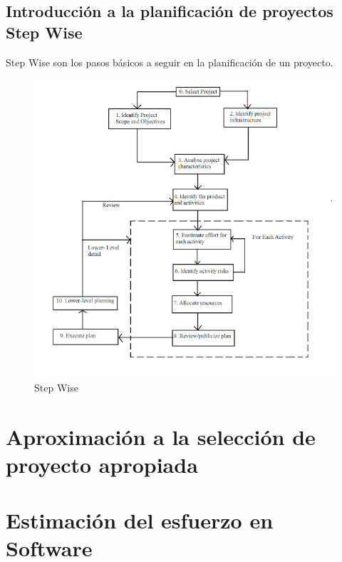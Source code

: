 \documentclass[12pt]{article}
\begin{document}
\subsection[Introducción a la planificación de proyectos Step Wise]{Introducción a la planificación de proyectos \\Step Wise}

{Step Wise son los pasos básicos a seguir en la planificación de un proyecto.}

\begin{figure} [ht]
    \centering
    \includegraphics[width=\textwidth]{step_wise.png}
    \caption{Step Wise}
    \label{fig:3.1}
\end{figure}


\newpage
\section[Aproximación a la selección de proyecto apropiada]{Aproximación a la selección de\\proyecto apropiada}
\label{4.0.0}


\newpage
\section{Estimación del esfuerzo en Software}
\label{5.0.0}
\end{document}
